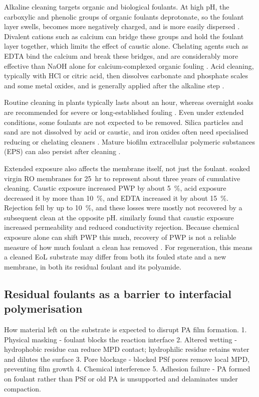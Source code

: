 Alkaline cleaning targets organic and biological foulants. At high pH, the carboxylic and phenolic groups of organic foulants deprotonate, so the foulant layer swells, becomes more negatively charged, and is more easily dispersed \citep{Ang2006}. Divalent cations such as calcium can bridge these groups and hold the foulant layer together, which limits the effect of caustic alone. Chelating agents such as EDTA bind the calcium and break these bridges, and are considerably more effective than NaOH alone for calcium-complexed organic fouling \citep{Ang2006, elimelech2005chemical}. Acid cleaning, typically with HCl or citric acid, then dissolves carbonate and phosphate scales and some metal oxides, and is generally applied after the alkaline step \citep{DuPont2026}.

Routine cleaning in plants typically lasts about an hour, whereas overnight soaks are recommended for severe or long-established fouling \citep{DuPont2026}. Even under extended conditions, some foulants are not expected to be removed. Silica particles and sand are not dissolved by acid or caustic, and iron oxides often need specialised reducing or chelating cleaners . Mature biofilm extracellular polymeric substances (EPS) can also persist after cleaning .

Extended exposure also affects the membrane itself, not just the foulant. \cite{tu2015chemical} soaked virgin RO membranes for \qty{25}{hr} to represent about three years of cumulative cleaning. Caustic exposure increased PWP by about \qty{5}{\percent}, acid exposure decreased it by more than \qty{10}{\percent}, and EDTA increased it by about \qty{15}{\percent}. Rejection fell by up to \qty{10}{\percent}, and these losses were mostly not recovered by a subsequent clean at the opposite pH. \cite{fujioka2014nitrosamine} similarly found that caustic exposure increased permeability and reduced conductivity rejection. Because chemical exposure alone can shift PWP this much, recovery of PWP is not a reliable measure of how much foulant a clean has removed \citep{tu2015chemical}. For regeneration, this means a cleaned EoL substrate may differ from both its fouled state and a new membrane, in both its residual foulant and its polyamide.


\subsection{Residual foulants as a barrier to interfacial polymerisation}
How material left on the substrate is expected to disrupt PA film formation.
1. Physical masking - foulant blocks the reaction interface
2. Altered wetting - hydrophobic residue can reduce MPD contact; hydrophilic residue retains water and dilutes the surface
3. Pore blockage - blocked PSf pores remove local MPD, preventing film growth
4. Chemical interference
5. Adhesion failure - PA formed on foulant rather than PSf or old PA is unsupported and delaminates under compaction.

